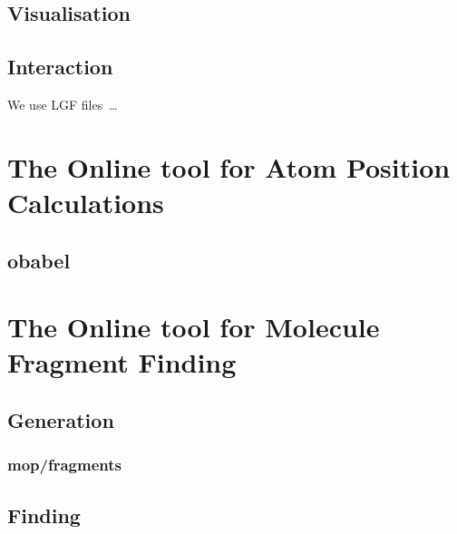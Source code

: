 \subsection{Visualisation}
\nlipsum

\subsection{Interaction}
We use LGF files~\cite{dezso2011lemon}\ldots

\nlipsum


\section[\oapoc]{The Online tool for Atom Position Calculations}
\nlipsum

\subsection{obabel}
\nlipsum


\section[\omfraf]{The Online tool for Molecule Fragment Finding}
\nlipsum

\subsection{Generation}
\nlipsum

\subsubsection{mop/fragments}
\nlipsum

\subsection{Finding}
\nlipsum
